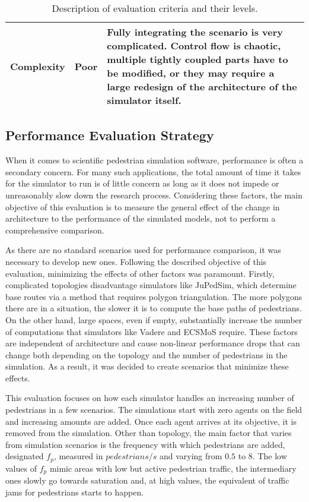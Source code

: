 \documentclass[twoside, 11pt]{article}
\begin{document}
\begin{center}
\begin{table}
\begin{tabularx}{\textwidth}{ | p{2.9cm} | l | X | }
      \\ 
      \hline
      Complexity & Poor & 
      Fully integrating the scenario is very complicated. Control flow is chaotic, multiple tightly coupled parts have to be modified, or they may require a large redesign of the architecture of the simulator itself.
      \\ 
      \hline
    \end{tabularx}
    \caption{Description of evaluation criteria and their levels.}
    \label{table:qualitative-evaluation-criteria}
  \end{table}
\end{center}

\subsection{Performance Evaluation Strategy} \label{sec:performace-evaluation}

When it comes to scientific pedestrian simulation software, performance is often a secondary concern. For many such applications, the total amount of time it takes for the simulator to run is of little concern as long as it does not impede or unreasonably slow down the research process. Considering these factors, the main objective of this evaluation is to measure the general effect of the change in architecture to the performance of the simulated models, not to perform a comprehensive comparison. 

As there are no standard scenarios used for performance comparison, it was necessary to develop new ones. Following the described objective of this evaluation, minimizing the effects of other factors was paramount. Firstly, complicated topologies disadvantage simulators like JuPedSim, which determine base routes via a method that requires polygon triangulation. The more polygons there are in a situation, the slower it is to compute the base paths of pedestrians. On the other hand, large spaces, even if empty, substantially increase the number of computations that simulators like Vadere and ECSMoS require. These factors are independent of architecture and cause non-linear performance drops that can change both depending on the topology and the number of pedestrians in the simulation. As a result, it was decided to create scenarios that minimize these effects.

This evaluation focuses on how each simulator handles an increasing number of pedestrians in a few scenarios. The simulations start with zero agents on the field and increasing amounts are added. Once each agent arrives at its objective, it is removed from the simulation. Other than topology, the main factor that varies from simulation scenarios is the frequency with which pedestrians are added, designated $f_p$, measured in $pedestrians/s$ and varying from $0.5$ to $8$. The low values of $f_p$ mimic areas with low but active pedestrian traffic, the intermediary ones slowly go towards saturation and, at high values, the equivalent of traffic jams for pedestrians starts to happen.
\end{document}
